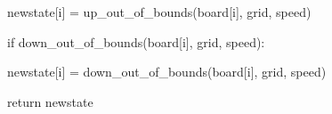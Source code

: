 \documentclass{article}
\begin{document}
{\vspace{0.434pt}            newstate[i] = up\_{}out\_{}of\_{}bounds(board[i], grid, speed) 

\vspace{-0.018pt}        if down\_{}out\_{}of\_{}bounds(board[i], grid, speed): 

\vspace{0.434pt}            newstate[i] = down\_{}out\_{}of\_{}bounds(board[i], grid, speed) 

\vspace{7.898pt}  return newstate 


\vspace{18.308pt}{\fontsize{16.14pt}{19.368pt}\selectfont{} }}%
%
\newpage{}%
%
\end{document}
